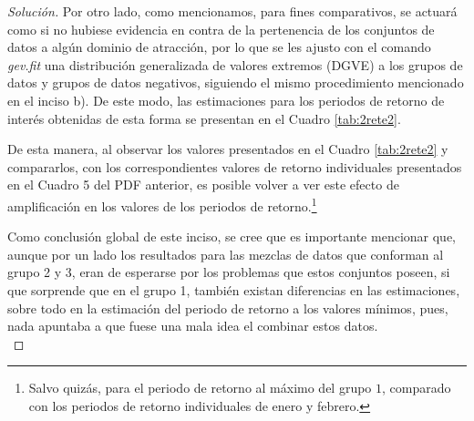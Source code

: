 \documentclass[10.5pt,notitlepage]{article}
\newenvironment{solucion}
  {\begin{proof}[Solución]}
  {\end{proof}}
\theoremstyle{plain}
\begin{document}
\begin{solucion}
Por otro lado, como mencionamos, para fines comparativos, se actuará como si no hubiese evidencia en contra de la pertenencia de los conjuntos de datos a algún dominio de atracción, por lo que se les ajusto con el comando \textit{gev.fit} una distribución generalizada de valores extremos (DGVE) a los grupos de datos y grupos de datos negativos, siguiendo el mismo procedimiento mencionado en el inciso b). De este modo, las estimaciones para los periodos de retorno de interés obtenidas de esta forma se presentan en el Cuadro \ref{tab:2rete2}.
\begin{table}[H]
        \centering
        \caption{Periodos de retorno de temperaturas máximas en Albania por grupo.}
        \label{tab:2rete2}
\end{table}	
De esta manera, al observar los valores presentados en el Cuadro \ref{tab:2rete2} y compararlos, con los correspondientes valores de retorno individuales presentados en el Cuadro 5 del PDF anterior, es posible volver a ver este efecto de amplificación en los valores de los periodos de retorno.\footnote{Salvo quizás, para el periodo de retorno al máximo del grupo \(1\), comparado con los periodos de retorno individuales de enero y febrero.} 

Como conclusión global de este inciso, se cree que es importante mencionar que, aunque por un lado los resultados para las mezclas de datos que conforman al grupo 2 y 3, eran de esperarse por los problemas que estos conjuntos poseen, si que sorprende que en el grupo 1, también existan diferencias en las estimaciones, sobre todo en la estimación del periodo de retorno a los valores mínimos, pues, nada apuntaba a que fuese una mala idea el combinar estos datos.\\


\end{solucion}
\end{document}
